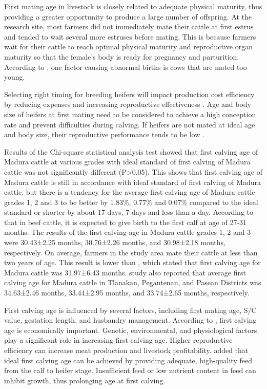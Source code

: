 \documentclass[9pt,article,twoside]{fapet-rho-class/fapet-rho}
\begin{document}
First mating age in livestock is closely related to adequate physical maturity, thus providing a greater opportunity to produce a large number of offspring. At the research site, most farmers did not immediately mate their cattle at first estrus and tended to wait several more estruses before mating. This is because farmers wait for their cattle to reach optimal physical maturity and reproductive organ maturity so that the female's body is ready for pregnancy and parturition. According to \citet{Wicaksana2024}, one factor causing abnormal births is cows that are mated too young.

Selecting right timing for breeding heifers will impact production cost efficiency by reducing expenses and increasing reproductive effectiveness \citep{Wicaksana2024}. Age and body size of heifers at first mating need to be considered to achieve a high conception rate and prevent difficulties during calving. If heifers are not mated at ideal age and body size, their reproductive performance tends to be low \citep{Desinawati2010}.

Results of the Chi-square statistical analysis test showed that first calving age of Madura cattle at various grades with ideal standard of first calving of Madura cattle was not significantly different (P>0.05). This shows that first calving age of Madura cattle is still in accordance with ideal standard of first calving of Madura cattle, but there is a tendency for the average first calving age of Madura cattle grades 1, 2 and 3 to be better by 1.83\%, 0.77\% and 0.07\% compared to the ideal standard or shorter by about 17 days, 7 days and less than a day. According to \citet{Ismaya2014} that in beef cattle, it is expected to give birth to the first calf at age of 27-31 months. The results of the first calving age in Madura cattle grades 1, 2 and 3 were 30.43±2.25 months, 30.76±2.26 months, and 30.98±2.18 months, respectively. On average, farmers in the study area mate their cattle at less than two years of age. This result is lower than \citet{Kutsiyah2017}, which stated that first calving age for Madura cattle was 31.97±6.43 months. \citet{Wisono2015} study also reported that average first calving age for Madura cattle in Tlanakan, Pegantenan, and Pasean Districts was 34.63±2.46 months, 33.44±2.95 months, and 33.74±2.65 months, respectively.

First calving age is influenced by several factors, including first mating age, S/C value, gestation length, and husbandry management. According to \citet{Pelmus2024}, first calving age is economically important. Genetic, environmental, and physiological factors play a significant role in increasing first calving age. Higher reproductive efficiency can increase meat production and livestock profitability. \citet{Awan2016} added that ideal first calving age can be achieved by providing adequate, high-quality feed from the calf to heifer stage. Insufficient feed or low nutrient content in feed can inhibit growth, thus prolonging age at first calving.
\end{document}
